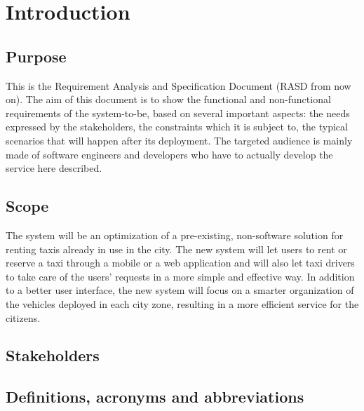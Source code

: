 \section{Introduction}

\subsection{Purpose}
This is the Requirement Analysis and Specification Document (RASD from now on). The aim of this document is to show the functional and non-functional requirements of the system-to-be, based on several important aspects: the needs expressed by the stakeholders, the constraints which it is subject to, the typical scenarios that will happen after its deployment. The targeted audience is mainly made of software engineers and developers who have to actually develop the service here described.

\subsection{Scope}
The system will be an optimization of a pre-existing, non-software solution for renting taxis already in use in the city. The new system will let users to rent or reserve a taxi through a mobile or a web application and will also let taxi drivers to take care of the users' requests in a more simple and effective way. In addition to a better user interface, the new system will focus on a smarter organization of the vehicles deployed in each city zone, resulting in a more efficient service for the citizens.

\subsection{Stakeholders}

\subsection{Definitions, acronyms and abbreviations}
